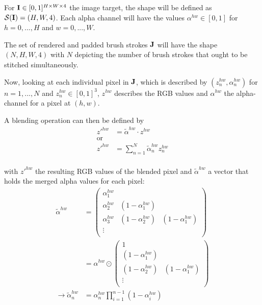 For $\mathbf{I} \in [0, 1]^{H \times W \times 4} $ the image target, the shape will be defined
as $\mathcal{S}(\mathbf{I}) = (H, W, 4)$.
Each alpha channel will have the values $\alpha^{hw} \in [0, 1]$ for $h = 0, ..., H$ and $w = 0, ..., W$.

The set of rendered and padded brush strokes $\mathbf{J}$ will have the shape $(N, H, W, 4)$
with $N$ depicting the number of brush strokes that ought to be stitched simultaneously.

Now, looking at each individual pixel in $\mathbf{J}$, which is described by $(z^{hw}_n, \alpha^{hw}_n)$
for $n = 1, ..., N$ and $z^{hw}_n \in [0, 1]^{3}$, $z^{hw}$ describes the RGB values
and $\alpha^{hw}$ the alpha-channel for a pixel at $(h, w)$.

A blending operation can then be defined by
\begin{align}
    z'^{hw} & = \tilde{\alpha}^{hw} \cdot z^{hw} \\
    \text{or} \\
    z'^{hw} & = \sum_{n=1}^N \tilde{\alpha}^{hw}_n  z^{hw}_n \\
\end{align}

with $z'^{hw}$ the resulting RGB values of the blended pixel and $\tilde{\alpha}^{hw}$
a vector that holds the merged alpha values for each pixel:
\begin{align}
    \tilde{\alpha}^{hw} & =
    \begin{pmatrix}
        \alpha^{hw}_1 & &\\
        \alpha^{hw}_2 & (1 - \alpha^{hw}_1) &\\
        \alpha^{hw}_3 & (1 - \alpha^{hw}_2) & (1 - \alpha^{hw}_1)\\
        \vdots & &\\
    \end{pmatrix}
    \\
    & = \alpha^{hw} \odot 
    \begin{pmatrix}
        1  &\\
        (1 - \alpha^{hw}_1) &\\
        (1 - \alpha^{hw}_2) & (1 - \alpha^{hw}_1)\\
        \vdots &\\
    \end{pmatrix}
    \\
    \rightarrow  \tilde{\alpha}^{hw}_n & = \alpha^{hw}_n \prod^{n-1}_{i=1} (1 - \alpha^{hw}_i)
\end{align}

